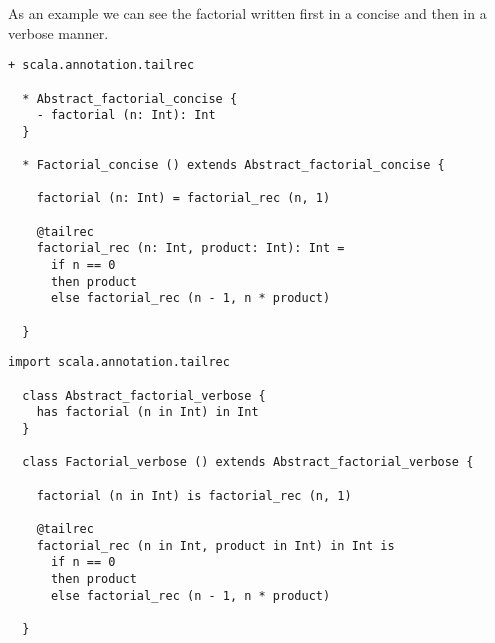 \documentclass[12pt,a4paper]{book}
\begin{document}
    As an example we can see the factorial written first in a concise and then in a verbose manner.

    \begin{lstlisting}[label={lst:exampleFactorialConcise}]
  + scala.annotation.tailrec

  * Abstract_factorial_concise {
    - factorial (n: Int): Int
  }

  * Factorial_concise () extends Abstract_factorial_concise {

    factorial (n: Int) = factorial_rec (n, 1)

    @tailrec
    factorial_rec (n: Int, product: Int): Int =
      if n == 0
      then product
      else factorial_rec (n - 1, n * product)

  }
    \end{lstlisting}


    \begin{lstlisting}[label={lst:exampleFactorialVerbose}]
  import scala.annotation.tailrec

  class Abstract_factorial_verbose {
    has factorial (n in Int) in Int
  }

  class Factorial_verbose () extends Abstract_factorial_verbose {

    factorial (n in Int) is factorial_rec (n, 1)

    @tailrec
    factorial_rec (n in Int, product in Int) in Int is
      if n == 0
      then product
      else factorial_rec (n - 1, n * product)

  }
    \end{lstlisting}
\end{document}
